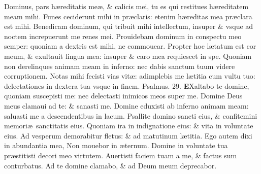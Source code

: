 \documentclass[a5paper,10pt]{book}
\def\ae{æ}
\begin{document}
\begin{multicols*}{2}
\newline \color{red} D\color{black}ominus, pars h\ae reditatis me\ae , \& calicis mei, tu es qui restitues h\ae reditatem meam mihi.
\newline \color{red} F\color{black}unes ceciderunt mihi in pr\ae claris: etenim h\ae reditas mea pr\ae clara est mihi.
\newline \color{red} B\color{black}enedicam dominum, qui tribuit mihi intellectum, insuper \& vsque ad noctem increpuerunt me renes mei.
\newline \color{red} P\color{black}rouidebam dominum in conspectu meo semper: quoniam a dextris est mihi, ne commouear.
\newline \color{red} P\color{black}ropter hoc l\ae tatum est cor meum, \& exultauit lingua mea: insuper \& caro mea requiescet in spe.
\newline \color{red} Q\color{black}uoniam non derelinques animam meam in inferno: nec dabis sanctum tuum videre corruptionem.
\newline \color{red} N\color{black}otas mihi fecisti vias vit\ae : adimplebis me l\ae titia cum vultu tuo: delectationes in dextera tua vsque in finem.
\newline \color{red} Psalmus. \hypertarget{ps29}{29.} \color{black}
\vspace{-1em}
\lettrine[lines=2]{\bfseries \color{red} E}{}Xaltabo te domine, quoniam suscepisti me: nec delectasti inimicos meos super me.
\newline \color{red} D\color{black}omine Deus meus clamaui ad te: \& sanasti me.
\newline \color{red} D\color{black}omine eduxisti ab inferno animam meam: saluasti me a descendentibus in lacum.
\newline \color{red} P\color{black}sallite domino sancti eius, \& confitemini memori\ae \ sanctitatis eius.
\newline \color{red} Q\color{black}uoniam ira in indignatione eius: \& vita in voluntate eius.
\newline \color{red} A\color{black}d vesperum demorabitur fletus: \& ad matutinum l\ae titia.
\newline \color{red} E\color{black}go autem dixi in abundantia mea, Non mouebor in \ae ternum.
\newline \color{red} D\color{black}omine in voluntate tua pr\ae stitisti decori meo virtutem.
\newline \color{red} A\color{black}uertisti faciem tuam a me, \& factus sum conturbatus.
\newline \color{red} A\color{black}d te domine clamabo, \& ad Deum meum deprecabor.

\end{multicols*}
\end{document}
